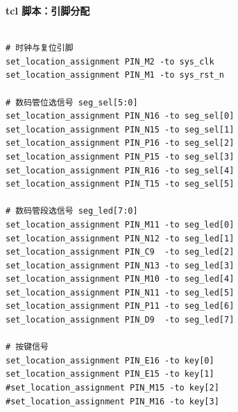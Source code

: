 \documentclass[UTF8]{article}
\theoremstyle{MyLineTheoremStyle} %
\theoremstyle{MyBlockTheoremStyle} %
\theoremstyle{MySubsubsectionStyle} %
\begin{document}
\textbf{tcl 脚本：引脚分配}
\begin{lstlisting}

# 时钟与复位引脚
set_location_assignment PIN_M2 -to sys_clk
set_location_assignment PIN_M1 -to sys_rst_n

# 数码管位选信号 seg_sel[5:0]
set_location_assignment PIN_N16 -to seg_sel[0]
set_location_assignment PIN_N15 -to seg_sel[1]
set_location_assignment PIN_P16 -to seg_sel[2]
set_location_assignment PIN_P15 -to seg_sel[3]
set_location_assignment PIN_R16 -to seg_sel[4]
set_location_assignment PIN_T15 -to seg_sel[5]

# 数码管段选信号 seg_led[7:0]
set_location_assignment PIN_M11 -to seg_led[0]
set_location_assignment PIN_N12 -to seg_led[1]
set_location_assignment PIN_C9  -to seg_led[2]
set_location_assignment PIN_N13 -to seg_led[3]
set_location_assignment PIN_M10 -to seg_led[4]
set_location_assignment PIN_N11 -to seg_led[5]
set_location_assignment PIN_P11 -to seg_led[6]
set_location_assignment PIN_D9  -to seg_led[7]

# 按键信号
set_location_assignment PIN_E16 -to key[0]
set_location_assignment PIN_E15 -to key[1]
#set_location_assignment PIN_M15 -to key[2]
#set_location_assignment PIN_M16 -to key[3]

\end{lstlisting}


\cleardoublepage
\end{document}
